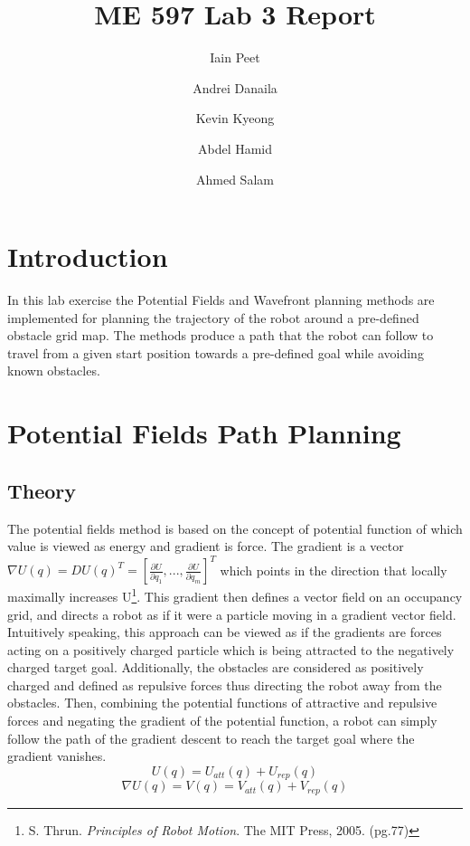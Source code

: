 \documentclass[11pt]{article} %
\title{ME 597 Lab 3 Report}
\author{Iain Peet \and Andrei Danaila \and Kevin Kyeong \and Abdel Hamid \and Ahmed Salam}
\begin{document}
\maketitle

\clearpage

\section*{Introduction}
In this lab exercise the Potential Fields and Wavefront planning methods are implemented for planning the trajectory of the robot around a pre-defined obstacle grid map. The methods produce a path that the robot can follow to travel from a given start position towards a pre-defined goal while avoiding known obstacles.

\section{Potential Fields Path Planning}
\subsection{Theory}
The potential fields method is based on the concept of potential function of which value is viewed as energy and gradient is force.  The gradient is a vector $\nabla U(q) = DU(q)^T = [\frac{\partial U}{\partial q_1}, . . . , \frac{\partial U}{\partial q_m}]^T$ which points in the direction that locally maximally increases U\footnote{S. Thrun. \emph{Principles of Robot Motion}. The MIT Press, 2005. (pg.77)}.  This gradient then defines a vector field on an occupancy grid, and directs a robot as if it were a particle moving in a gradient vector field\footnotemark[\value{footnote}].  Intuitively speaking, this approach can be viewed as if the gradients are forces acting on a positively charged particle which is being attracted to the negatively charged target goal\footnotemark[\value{footnote}].  Additionally, the obstacles are considered as positively charged and defined as repulsive forces thus directing the robot away from the obstacles.  Then, combining the potential functions of attractive and repulsive forces and negating the gradient of the potential function, a robot can simply follow the path of the gradient descent to reach the target goal where the gradient vanishes.
\begin{equation}
	U(q) = U_{att}(q) + U_{rep}(q)
\end{equation}
\begin{equation}
	\nabla U(q) = V(q) = V_{att}(q) + V_{rep}(q)
\end{equation}
\end{document}
